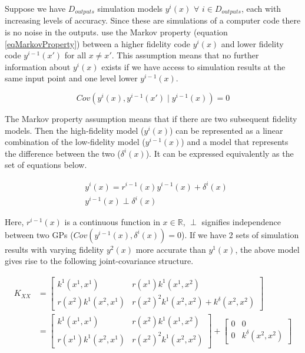 Suppose we have $D_{outputs}$ simulation models $y^{i}(x)$  $\forall$ $ i \in D_{outputs}$, each with increasing levels of accuracy. Since these are simulations of a computer code there is no noise in the outputs. \cite{o1998markov} use the Markov property (equation \ref{eqMarkovProperty}) between a higher fidelity code $y^{i}(x)$ and lower fidelity code $y^{i-1}(x')$ for all $x \neq x'$. This assumption means that no further information about $y^{i}(x)$ exists if we have access to simulation results at the same input point and one level lower $y^{i-1}(x)$. 

\begin{equation}\label{eqMarkovProperty}
         Cov(y^{i}(x), y^{i-1}(x') \mid y^{i-1}(x)) = 0
\end{equation}

The Markov property assumption means that if there are two subsequent fidelity models. Then the high-fidelity model ($y^{i}(x)$) can be represented as a linear combination of the low-fidelity model ($y^{i-1}(x)$) and a model that represents the difference between the two ($\delta^{i}(x)$). It can be expressed equivalently as the set of equations below. 

\begin{align}
  & y^{i}(x) = r^{i-1}(x)y^{i-1}(x) + \delta^{i}(x) \\
  & y^{i-1}(x) \perp \delta^{i}(x)
\end{align}

Here, $r^{i-1}(x)$ is a continuous function in $x \in \mathbb{R}$, $\perp$ signifies independence between two GPs ($Cov(y^{i-1}(x), \delta^{i}(x)) = 0$). If we have 2 sets of simulation results with varying fidelity $y^{2}(x)$ more accurate than $y^{1}(x)$, the above model gives rise to the following joint-covariance structure.

\begin{equation}\label{eqJointCovarianceMultiFidelity}
         \begin{aligned}
           K_{XX}   & = \begin{bmatrix} k^{1}(x^{1}, x^{1}) & r(x^{1})k^{1}(x^{1}, x^{2})   \\
           r(x^{2})k^{1}(x^{2}, x^{1}) & r(x^{2})^2k^{1}(x^{2}, x^{2}) + k^{\delta}(x^{2}, x^{2}) \end{bmatrix} \\ 
           & = \begin{bmatrix} k^{1}(x^{1}, x^{1}) & r(x^{2})k^{1}(x^{1}, x^{2})   \\ r(x^{1})k^{1}(x^{2}, x^{1}) & r(x^{2})^2k^{1}(x^{2}, x^{2}) \end{bmatrix} 
           +  
\begin{bmatrix} 0 & 0 \\ 0 & k^{\delta}(x^{2}, x^{2}) \end{bmatrix} 
         \end{aligned}
\end{equation}

